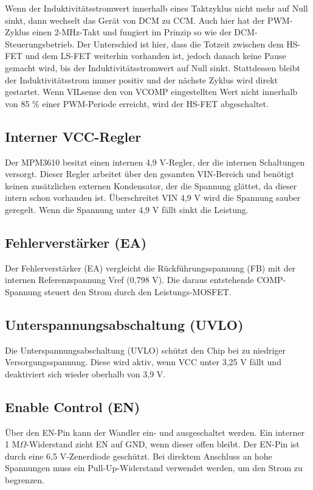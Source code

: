 Wenn der Induktivitätsstromwert innerhalb eines Taktzyklus nicht mehr auf Null sinkt, dann wechselt das Gerät von DCM zu CCM. Auch hier hat der PWM-Zyklus einen 2-MHz-Takt und fungiert im Prinzip so wie der DCM-Steuerungsbetrieb. Der Unterschied ist hier, dass die Totzeit zwischen dem HS-FET und dem LS-FET weiterhin vorhanden ist, jedoch danach keine Pause gemacht wird, bis der Induktivitätsstromwert auf Null sinkt. Stattdessen bleibt der Induktivitätsstrom immer positiv und der nächste Zyklus wird direkt gestartet. Wenn VILsense den von VCOMP eingestellten Wert nicht innerhalb von 85 \% einer PWM-Periode erreicht, wird der HS-FET abgeschaltet. \cite{MPS:2015}

\subsection{Interner VCC-Regler}

Der MPM3610 besitzt einen internen 4,9 V-Regler, der die internen Schaltungen versorgt. Dieser Regler arbeitet über den gesamten VIN-Bereich und benötigt keinen zusätzlichen externen Kondensator, der die Spannung glättet, da dieser intern schon vorhanden ist. Überschreitet VIN 4,9 V wird die Spannung sauber geregelt. Wenn die Spannung unter 4,9 V fällt sinkt die Leistung. \cite{MPS:2015}

\subsection{Fehlerverstärker (EA)}

Der Fehlerverstärker (EA) vergleicht die Rückführungsspannung (FB) mit der internen Referenzspannung Vref (0,798 V). Die daraus entstehende COMP-Spannung steuert den Strom durch den Leistungs-MOSFET. \cite{MPS:2015}

\subsection{Unterspannungsabschaltung (UVLO)}

Die Unterspannungsabschaltung (UVLO) schützt den Chip bei zu niedriger Versorgungsspannung. Diese wird aktiv, wenn VCC unter 3,25 V fällt und deaktiviert sich wieder oberhalb von 3,9 V. \cite{MPS:2015}

\subsection{Enable Control (EN)}

Über den EN-Pin kann der Wandler ein- und ausgeschaltet werden. Ein interner 1 M$\Omega$-Widerstand zieht EN auf GND, wenn dieser offen bleibt. Der EN-Pin ist durch eine 6,5 V-Zenerdiode geschützt. Bei direktem Anschluss an hohe Spannungen muss ein Pull-Up-Widerstand verwendet werden, um den Strom zu begrenzen. \cite{MPS:2015}

